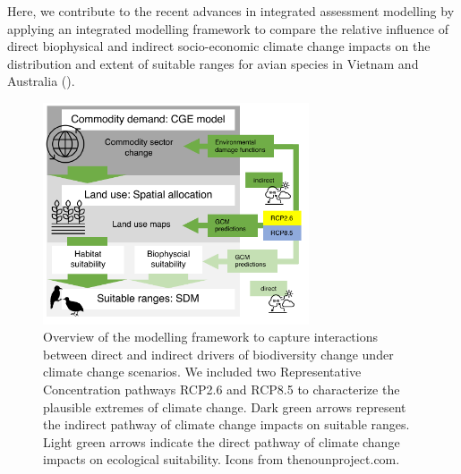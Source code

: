 \documentclass[titlesmallcaps,copyrightpage]{uomthesis}\usepackage[]{graphicx}\usepackage[]{color}
\begin{document}
Here, we contribute to the recent advances in integrated assessment modelling \citep{leclere_bending_2020,  newbold_future_2018, powers_global_2019, marques_increasing_2019} by applying an integrated modelling framework to compare the relative influence of direct biophysical and indirect socio-economic climate change impacts on the distribution and extent of suitable ranges for avian species in Vietnam and Australia ().

\begin{figure}[htb]
  \centering
  \includegraphics[width=0.7\textwidth]{chapters/figures/chapter2/fig1.pdf}
  \caption{Overview of the modelling framework to capture interactions between direct and indirect drivers of biodiversity change under climate change scenarios. We included two Representative Concentration pathways RCP2.6 and RCP8.5 to characterize the plausible extremes of climate change. Dark green arrows represent the indirect pathway of climate change impacts on suitable ranges. Light green arrows indicate the direct pathway of climate change impacts on ecological suitability. Icons from thenounproject.com.}
  \label{ch2:fig1}
\end{figure}
\end{document}
